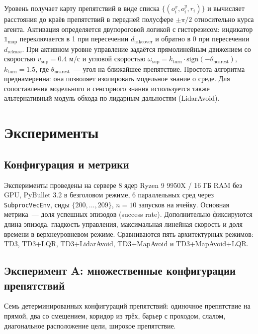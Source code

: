 \documentclass[11pt]{article}
\begin{document}
Уровень получает карту препятствий в виде списка $\{(o^x_i, o^y_i, r_i)\}$ и вычисляет расстояния до краёв препятствий в передней полусфере $\pm \pi/2$ относительно курса агента. Активация определяется двупороговой логикой с гистерезисом: индикатор $\mathbb{1}_{\text{map}}$ переключается в 1 при пересечении $d_{\text{takeover}}$ и обратно в 0 при пересечении $d_{\text{release}}$. При активном уровне управление задаётся прямолинейным движением со скоростью $v_{\mathrm{sup}} = 0.4$ м/с и угловой скоростью $\omega_{\mathrm{sup}} = k_{\mathrm{turn}} \cdot \mathrm{sign}(-\theta_{\mathrm{nearest}})$, $k_{\mathrm{turn}} = 1.5$, где $\theta_{\mathrm{nearest}}$~--- угол на ближайшее препятствие. Простота алгоритма преднамеренна: она позволяет изолировать модельное знание о среде. Для сопоставления модельного и сенсорного знания используется также альтернативный модуль обхода по лидарным дальностям (LidarAvoid).


\section{Эксперименты}
\label{sec:experiments}

\subsection{Конфигурация и метрики}
\label{sec:exp_setup}

Эксперименты проведены на сервере 8 ядер Ryzen 9 9950X / 16 ГБ RAM без GPU, PyBullet 3.2 в безголовом режиме, 6 параллельных сред через \verb|SubprocVecEnv|, сиды $\{200, \ldots, 209\}$, $n = 10$ запусков на ячейку. Основная метрика~--- доля успешных эпизодов (success rate). Дополнительно фиксируются длина эпизода, гладкость управления, максимальная линейная скорость и доля времени в верхнеуровневом режиме. Сравниваются пять архитектурных режимов: TD3, TD3+LQR, TD3+LidarAvoid, TD3+MapAvoid и TD3+MapAvoid+LQR.


\subsection{Эксперимент A: множественные конфигурации препятствий}
\label{sec:exp_a}

Семь детерминированных конфигураций препятствий: одиночное препятствие на прямой, два со смещением, коридор из трёх, барьер с проходом, слалом, диагональное расположение цели, широкое препятствие.
\end{document}
